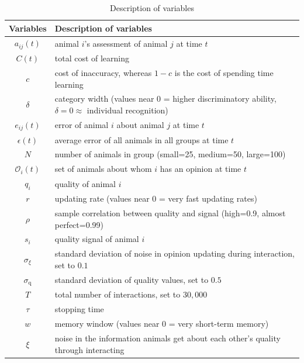 %
\begin {table}[ht]
\caption {Description of variables} \label{tab:vars} 
\begin{tabular}{cl}

 Variables & Description of variables \\
\midrule 
$a_{ij}(t)$ & animal $i$'s assessment of animal $j$ at time $t$ \\
$C(t)$ & total cost of learning \\ 
$c$ & cost of inaccuracy, whereas $1-c$ is the cost of spending time learning \\ 
$\delta$ & category width (values near 0 = higher discriminatory ability, $\delta=0 \approx$ individual recognition)\\
$e_{ij}(t)$ & error of animal $i$ about animal $j$ at time $t$\\
$\epsilon(t)$ & average error of all animals in all groups at time $t$ \\
$N$ & number of animals in group (small=25, medium=50, large=100)\\ 
$\mathscr{O}_i(t)$ & set of animals about whom $i$ has an opinion at time $t$\\
$q_i$ & quality of animal $i$ \\ 
$r$ & updating rate (values near 0 = very fast updating rates)\\
$\rho$ & sample correlation between quality and signal (high=0.9, almost perfect=0.99)\\
$s_i$ & quality signal of animal $i$ \\ 
$\sigma_\xi$ & standard deviation of noise in opinion updating during interaction, set to $0.1$ \\
$\sigma_\text{q}$ & standard deviation of quality values, set to $0.5$ \\
$T$ & total number of interactions, set to $30,000$ \\
$\tau$ & stopping time \\
$w$ & memory window (values near 0 = very short-term memory)\\
$\xi$ & noise in the information animals get about each other's quality through interacting
\end{tabular}
\end {table}



